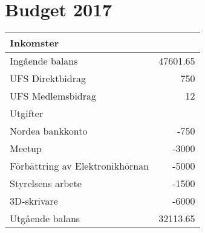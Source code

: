 \documentclass[a4paper,11pt,oneside]{article}
\begin{document}
\section{Budget 2017}

\begin{tabular}{lr}
  \toprule
  Inkomster & \\
  \midrule
  Ingående balans & 47601.65\\
  UFS Direktbidrag & 750\\
  UFS Medlemsbidrag & 12\\
  \midrule
  Utgifter & \\
  \midrule
  Nordea bankkonto & -750\\
  Meetup & -3000\\
  Förbättring av Elektronikhörnan & -5000\\
  Styrelsens arbete & -1500\\
  3D-skrivare & -6000\\
  \midrule
  Utgående balans & 32113.65\\
  \bottomrule
\end{tabular}
\end{document}
